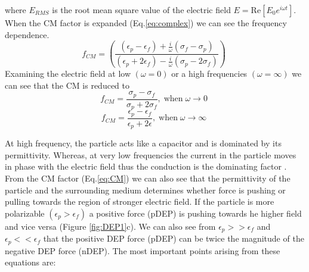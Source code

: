 \documentclass[final]{jyflluk}
\begin{document}
%
where $E_{RMS}$ is the root mean square value of the electric field $E=\mathrm{Re}[E_0 e^{i \omega t}]$. When the CM factor is expanded (Eq.\ref{eq:complex}) we can see the frequency dependence.
%
\begin{equation}
   \label{eq:CM_open}
   f_{CM} = \left(\frac{(\epsilon_{p} - \epsilon_{f}) + \frac{i}{\omega} (\sigma_f - \sigma_p)}
   {(\epsilon_{p} + 2\epsilon_{f}) - \frac{i}{\omega} (\sigma_p - 2\sigma_f)} \right)\;
\end{equation}
%
Examining the electric field at low  $(\omega = 0)$ or a high frequencies $(\omega = \infty)$ we can see that the CM is reduced to 
\begin{equation}
   \label{eq:wat0}
   f_{CM} = \frac{\sigma_p - \sigma_f} {\sigma_p + 2\sigma_f}, \; \mathrm{when } \;\omega \rightarrow 0 \;
\end{equation}
\begin{equation}
   \label{eq:watinf}
   f_{CM} = \frac{\epsilon_p - \epsilon_f} {\epsilon_p + 2\epsilon}, \;\mathrm{when } \;\omega \rightarrow \infty\;
\end{equation}





At high frequency, the particle acts like a capacitor and is dominated by its permittivity. Whereas, at very low frequencies the current in the particle moves in phase with the electric field thus the conduction is the dominating factor \cite{cetin_dielectrophoresis_2011, li_review_2014, pethig_review_2010}. 
From the CM factor (Eq.\ref{eq:CM}) we can also see that the permittivity of the particle and the surrounding medium determines whether force is pushing or pulling towards the region of stronger electric field. If the particle is more polarizable $(\epsilon_p>\epsilon_f)$ a positive force (pDEP) is pushing towards he higher field and vice versa (Figure \ref{fig:DEP1}c). We can also see from $\epsilon_p>>\epsilon_f$ and  $\epsilon_p<<\epsilon_f $ that the positive DEP force (pDEP) can be twice the magnitude of the negative DEP force (nDEP).
The most important points arising from these equations are:
\end{document}
